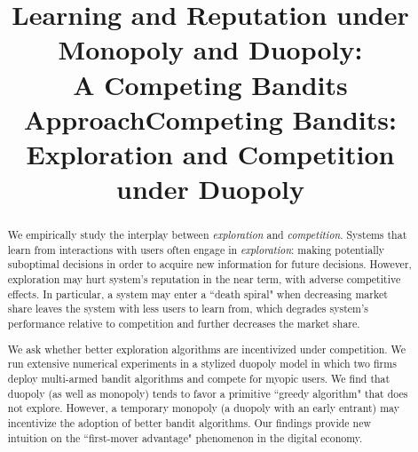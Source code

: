 \documentclass[letterpaper]{article}
\theoremstyle{definition}
\begin{document}
\title{Learning and Reputation under Monopoly and Duopoly: \\A Competing Bandits Approach}

\title{Competing Bandits: Exploration and Competition under Duopoly}


\maketitle


\begin{abstract}
We empirically study the interplay between \textit{exploration} and \textit{competition}. Systems that learn from interactions with users
often engage in \emph{exploration}: making potentially suboptimal decisions in order to acquire new information for future decisions. However, exploration may hurt system's reputation in the near term, with adverse competitive effects. In particular, a system may enter a ``death spiral" when decreasing market share leaves the system with less users to learn from, which degrades system's performance relative to competition and further decreases the market share.

We ask whether better exploration algorithms are incentivized under competition. We run extensive numerical experiments in a stylized duopoly model in which two firms deploy multi-armed bandit algorithms and compete for myopic users.  We find that duopoly (as well as monopoly) tends to favor a primitive ``greedy algorithm" that does not explore. However, a temporary monopoly (a duopoly with an early entrant) may incentivize the adoption of better bandit algorithms. Our findings provide new intuition on the ``first-mover advantage" phenomenon in the digital economy.
\end{abstract}
\end{document}
